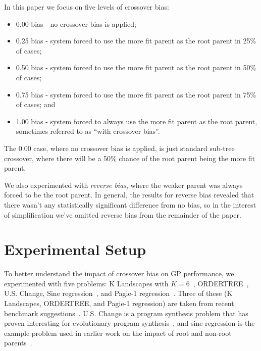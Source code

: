 \documentclass{sig-alternate}
\begin{document}
In this paper we focus on five levels of crossover bias:
\begin{itemize}
\item 0.00 bias - no crossover bias is applied;
\item 0.25 bias - system forced to use the more fit parent as the root parent in 25\% of cases;
\item 0.50 bias - system forced to use the more fit parent as the root parent in 50\% of cases;
\item 0.75 bias - system forced to use the more fit parent as the root parent in 75\% of cases; and
\item 1.00 bias - system forced to always use the more fit parent as the root parent, sometimes referred to as ``with crossover bias''.
\end{itemize}
The 0.00 case, where no crossover bias is applied, is just standard sub-tree crossover, where there will be a 50\% chance of the root parent being the more fit parent.

We also experimented with \emph{reverse bias}, where the weaker parent was always forced to be 
the root parent. In general, the results for reverse bias revealed that there wasn't any statistically significant difference from 
no bias, so in the 
interest of simplification we've omitted reverse bias from the remainder of the paper.

\section{Experimental Setup} \label{sec:Experiments}

To better understand the impact of crossover bias on GP performance, we 
experimented with five problems: K Landscapes with $K=6$~\cite{vanneschi2011k}, 
ORDER\-TREE~\cite{hoang2006ordertree}, U.S. Change, Sine regression~\cite{poli08:fieldguide}, 
and Pagie-1 regression~\cite{pagie1997evolutionary}.
Three of these (K Landscapes, ORDERTREE, and Pagie-1 regression) are taken from recent benchmark 
suggestions~\cite{gp-benchmarks-2013}. U.S. Change is a program synthesis problem  that has proven 
interesting for evolutionary program synthesis~\cite{zhan2014quantitative}, and sine regression 
is the example problem used in earlier work on the impact of root and non-root 
parents~\cite{McPheeDonatucciDramdahl:2014}.
\end{document}
